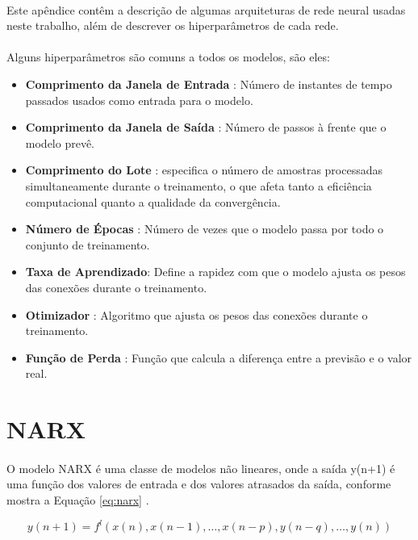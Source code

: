 \paragraph{} Este apêndice contêm a descrição de algumas arquiteturas de rede neural usadas neste trabalho, além de descrever os hiperparâmetros de cada rede.

\paragraph{} Alguns hiperparâmetros são comuns a todos os modelos, são eles:
\begin{itemize}
	\item \textbf{Comprimento da Janela de Entrada} : Número de instantes de tempo passados usados como entrada para o modelo.
	\item \textbf{Comprimento da Janela de Saída}   : Número de passos à frente que o modelo prevê.
	\item \textbf{Comprimento do Lote} : especifica o número de amostras processadas simultaneamente durante o treinamento, o que afeta tanto a eficiência computacional quanto a qualidade da convergência.
	\item \textbf{Número de Épocas} : Número de vezes que o modelo passa por todo o conjunto de treinamento.
	\item \textbf{Taxa de Aprendizado}: Define a rapidez com que o modelo ajusta os pesos das conexões durante o treinamento.
	\item \textbf{Otimizador} : Algoritmo que ajusta os pesos das conexões durante o treinamento.
	\item \textbf{Função de Perda} : Função que calcula a diferença entre a previsão e o valor real.
\end{itemize}

\section{\acf{NARX}}
\paragraph{} O modelo \ac{NARX} é uma classe de modelos não lineares, onde a saída y(n+1) é uma função dos valores de entrada e dos valores atrasados da saída, conforme mostra a Equação \ref{eq:narx} \cite{haykin1998neural}.

\begin{equation}
	y(n+1) = f^l(x(n), x(n-1), \hdots, x(n-p), y(n-q), \hdots, y(n))
	\label{eq:narx}
\end{equation}

